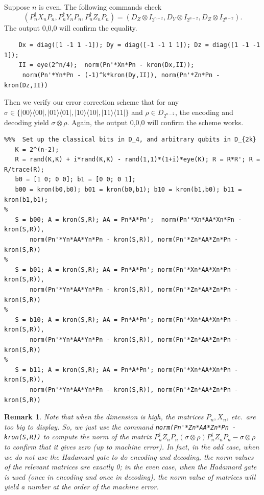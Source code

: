 \documentclass[11pt]{article}
\newtheorem{remark}[theorem]{Remark}
\def\ra{{\rangle}}
\def\la{{\langle}}
\begin{document}
Suppose $n$ is even. The following commands check
\begin{equation}\label{even}
(P_n^\dag X_n P_n,P_n^\dag Y_n P_n,P_n^\dag Z_n P_n) = 
(D_Z \otimes I_{2^{n-2}},D_Y \otimes I_{2^{n-2}}, D_Z \otimes I_{2^{n-2}}).\end{equation}
The output 0,0,0 will confirm the equality.
\begin{verbatim}
    Dx = diag([1 -1 1 -1]); Dy = diag([-1 -1 1 1]); Dz = diag([1 -1 -1 1]);
    II = eye(2^n/4);  norm(Pn'*Xn*Pn - kron(Dx,II)); 
     norm(Pn'*Yn*Pn - (-1)^k*kron(Dy,II)), norm(Pn'*Zn*Pn - kron(Dz,II))
\end{verbatim}
Then we verify our error correction scheme that for any $\sigma \in \{|00\ra\la 00|,
|01\ra\la 01|,|10\ra\la 10|,|11\ra\la 11|\}$ and $\rho \in D_{2^{n-2}}$,
the encoding and decoding yield $\sigma \otimes \rho$. Again, the output 0,0,0
will confirm the scheme works.
\begin{verbatim}
%%%  Set up the classical bits in D_4, and arbitrary qubits in D_{2k}
   K = 2^(n-2); 
   R = rand(K,K) + i*rand(K,K) - rand(1,1)*(1+i)*eye(K); R = R*R'; R = R/trace(R);
   b0 = [1 0; 0 0]; b1 = [0 0; 0 1]; 
   b00 = kron(b0,b0); b01 = kron(b0,b1); b10 = kron(b1,b0); b11 = kron(b1,b1);
%
   S = b00; A = kron(S,R); AA = Pn*A*Pn';  norm(Pn'*Xn*AA*Xn*Pn - kron(S,R)),
       norm(Pn'*Yn*AA*Yn*Pn - kron(S,R)), norm(Pn'*Zn*AA*Zn*Pn - kron(S,R))
%
   S = b01; A = kron(S,R); AA = Pn*A*Pn'; norm(Pn'*Xn*AA*Xn*Pn - kron(S,R)), 
       norm(Pn'*Yn*AA*Yn*Pn - kron(S,R)), norm(Pn'*Zn*AA*Zn*Pn - kron(S,R))
%
   S = b10; A = kron(S,R); AA = Pn*A*Pn'; norm(Pn'*Xn*AA*Xn*Pn - kron(S,R)), 
       norm(Pn'*Yn*AA*Yn*Pn - kron(S,R)), norm(Pn'*Zn*AA*Zn*Pn - kron(S,R))
%
   S = b11; A = kron(S,R); AA = Pn*A*Pn'; norm(Pn'*Xn*AA*Xn*Pn - kron(S,R)), 
       norm(Pn'*Yn*AA*Yn*Pn - kron(S,R)), norm(Pn'*Zn*AA*Zn*Pn - kron(S,R))
\end{verbatim}


\medskip\noindent
\begin{remark} \rm
Note that when the dimension is high, the matrices $P_n, X_n$, etc.\ are too big to display.
So, we just use the command \verb|norm(Pn'*Zn*AA*Zn*Pn - kron(S,R))| to compute the norm
of the matrix $P_n^\dag Z_n P_n(\sigma \otimes \rho)P_n^\dag Z_n P_n - \sigma \otimes \rho$
to confirm that it gives zero (up to machine error). In fact, in the odd case, when 
we do not use the Hadamard gate to do encoding and decoding, the norm values of
the relevant matrices are exactly 0; in the even case, when the Hadamard gate 
is used (once in encoding and once in decoding), the norm value of matrices 
will yield a number at the order of the machine error. 
\end{remark}
\end{document}
